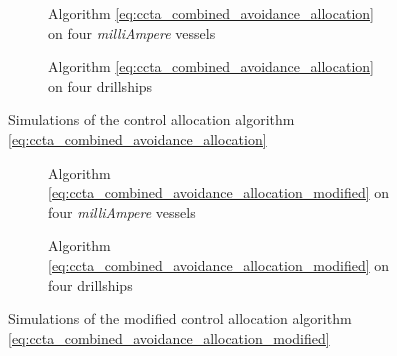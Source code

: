 \begin{figure*}[t]
    \centering
    \begin{subfigure}{\linewidth}
        \centering
        
        \vspace{-0.5em}
        \caption{Algorithm \eqref{eq:ccta_combined_avoidance_allocation} on four \emph{milliAmpere} vessels}
    \end{subfigure}
    \vspace{-1em}
    \begin{subfigure}{\linewidth}
        \centering
        
        \vspace{-2em}
        \caption{Algorithm \eqref{eq:ccta_combined_avoidance_allocation} on four drillships}
    \end{subfigure}
    \caption{Simulations of the control allocation algorithm \eqref{eq:ccta_combined_avoidance_allocation}}
    \label{fig:ccta_orig}
\end{figure*}

\begin{figure*}[t]
    \centering
    \begin{subfigure}{\linewidth}
        \centering
        
        \caption{Algorithm \eqref{eq:ccta_combined_avoidance_allocation_modified} on four \emph{milliAmpere} vessels}
        \vspace*{1em}
    \end{subfigure}
    \begin{subfigure}{\linewidth}
        \centering
        
        \caption{Algorithm \eqref{eq:ccta_combined_avoidance_allocation_modified} on four drillships}
    \end{subfigure}
    \caption{Simulations of the modified control allocation algorithm \eqref{eq:ccta_combined_avoidance_allocation_modified}}
    \label{fig:ccta_modified}
\end{figure*}

